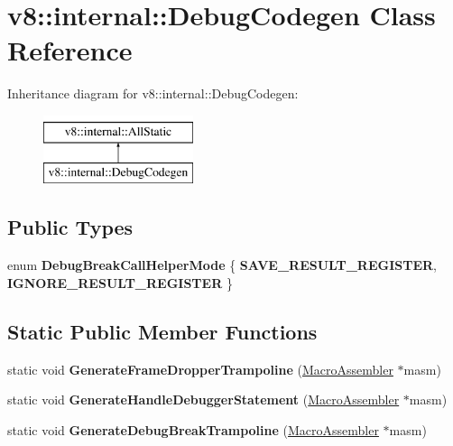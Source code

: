 \hypertarget{classv8_1_1internal_1_1DebugCodegen}{}\section{v8\+:\+:internal\+:\+:Debug\+Codegen Class Reference}
\label{classv8_1_1internal_1_1DebugCodegen}
Inheritance diagram for v8\+:\+:internal\+:\+:Debug\+Codegen\+:\begin{figure}[H]
\begin{center}
\leavevmode
\includegraphics[height=2.000000cm]{classv8_1_1internal_1_1DebugCodegen}
\end{center}
\end{figure}
\subsection*{Public Types}
\begin{DoxyCompactItemize}
\item 
\mbox{\label{classv8_1_1internal_1_1DebugCodegen_a26f19b53b037a3012fbd58fdc2d9514a}} 
enum {\bfseries Debug\+Break\+Call\+Helper\+Mode} \{ {\bfseries S\+A\+V\+E\+\_\+\+R\+E\+S\+U\+L\+T\+\_\+\+R\+E\+G\+I\+S\+T\+ER}, 
{\bfseries I\+G\+N\+O\+R\+E\+\_\+\+R\+E\+S\+U\+L\+T\+\_\+\+R\+E\+G\+I\+S\+T\+ER}
 \}
\end{DoxyCompactItemize}
\subsection*{Static Public Member Functions}
\begin{DoxyCompactItemize}
\item 
\mbox{\label{classv8_1_1internal_1_1DebugCodegen_a559aa516fe753e1b83bf030c5e8dcf73}} 
static void {\bfseries Generate\+Frame\+Dropper\+Trampoline} (\mbox{\hyperlink{classv8_1_1internal_1_1MacroAssembler}{Macro\+Assembler}} $\ast$masm)
\item 
\mbox{\label{classv8_1_1internal_1_1DebugCodegen_ac4d9faf07ca0e1a5afe1e22b7610a234}} 
static void {\bfseries Generate\+Handle\+Debugger\+Statement} (\mbox{\hyperlink{classv8_1_1internal_1_1MacroAssembler}{Macro\+Assembler}} $\ast$masm)
\item 
\mbox{\label{classv8_1_1internal_1_1DebugCodegen_ac974612b1f94cc71399f96bae826517a}} 
static void {\bfseries Generate\+Debug\+Break\+Trampoline} (\mbox{\hyperlink{classv8_1_1internal_1_1MacroAssembler}{Macro\+Assembler}} $\ast$masm)
\end{DoxyCompactItemize}


